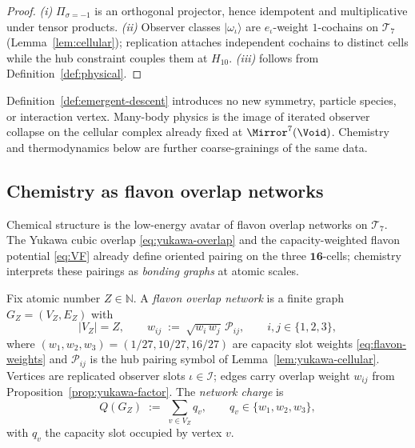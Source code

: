 \begin{proof}
\emph{(i)} $\Pi_{\sigma=-1}$ is an orthogonal projector, hence idempotent and
multiplicative under tensor products. \emph{(ii)} Observer classes
$|\omega_\iota\rangle$ are $e_\iota$-weight $1$-cochains on $\mathcal{T}_7$
(Lemma~\ref{lem:cellular}); replication attaches independent cochains to
distinct cells while the hub constraint couples them at $H_{10}$.
\emph{(iii)} follows from Definition~\ref{def:physical}.
\end{proof}

\begin{remark}
Definition~\ref{def:emergent-descent} introduces no new symmetry, particle
species, or interaction vertex. Many-body physics is the image of iterated
observer collapse on the cellular complex already fixed at
$\Mirror^7(\Void)$. Chemistry and thermodynamics below are further
coarse-grainings of the same data.
\end{remark}

\subsection{Chemistry as flavon overlap networks}
\label{sec:emergent:chemistry}

Chemical structure is the low-energy avatar of flavon overlap networks on
$\mathcal{T}_7$. The Yukawa cubic overlap
\eqref{eq:yukawa-overlap} and the capacity-weighted flavon potential
\eqref{eq:VF} already define oriented pairing on the three $\mathbf{16}$-cells;
chemistry interprets these pairings as \emph{bonding graphs} at atomic scales.

\begin{definition}\label{def:flavon-network}
Fix atomic number $Z\in\mathbb{N}$. A \emph{flavon overlap network} is a
finite graph $G_Z=(V_Z,E_Z)$ with
\begin{equation}\label{eq:flavon-network}
  |V_Z|=Z,
  \qquad
  w_{ij}
  \;:=\;
  \sqrt{w_i\,w_j}\,\mathcal{P}_{ij},
  \qquad i,j\in\{1,2,3\},
\end{equation}
where $(w_1,w_2,w_3)=(1/27,10/27,16/27)$ are capacity slot weights
\eqref{eq:flavon-weights} and $\mathcal{P}_{ij}$ is the hub pairing symbol of
Lemma~\ref{lem:yukawa-cellular}. Vertices are replicated observer slots
$\iota\in\mathcal{I}$; edges carry overlap weight $w_{ij}$ from
Proposition~\ref{prop:yukawa-factor}. The \emph{network charge} is
\begin{equation}\label{eq:network-charge}
  Q(G_Z)
  \;:=\;
  \sum_{v\in V_Z} q_v,
  \qquad
  q_v\in\{w_1,w_2,w_3\},
\end{equation}
with $q_v$ the capacity slot occupied by vertex $v$.
\end{definition}

